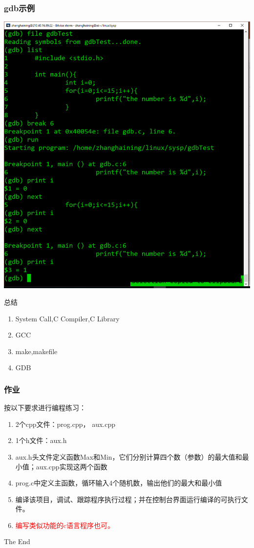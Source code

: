 \documentclass{beamer}
\begin{document}
\begin{frame}
\frametitle{gdb示例}
\includegraphics[width=0.8\linewidth]{605}

\end{frame}
\begin{frame}
\Huge{\centerline{总结}}
\begin{enumerate}
\item
System Call,C Compiler,C Library
\item
GCC
\item
make,makefile
\item
GDB
\end{enumerate}

\end{frame}

\begin{frame}
\frametitle{作业}
按以下要求进行编程练习：
\begin{enumerate}
\item
2个cpp文件：prog.cpp， aux.cpp
\item
1个h文件：aux.h
\item
aux.h头文件定义函数Max和Min，它们分别计算四个数（参数）的最大值和最小值；aux.cpp实现这两个函数
\item
prog.c中定义主函数，循环输入4个随机数，输出他们的最大和最小值
\item
编译该项目，调试、跟踪程序执行过程；并在控制台界面运行编译的可执行文件。
\item
\textcolor{red}{编写类似功能的c语言程序也可。}
\end{enumerate}
\end{frame}



\begin{frame}
\Huge{\centerline{The End}}
\end{frame}

\end{document}
